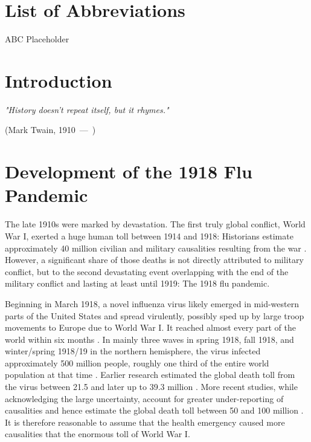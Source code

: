 \documentclass[12pt,a4paper]{article}
\let\oldquote\quote
\let\endoldquote\endquote
\renewenvironment{quote}[2][]
{\if\relax\detokenize{#1}\relax
	\def\quoteauthor{#2}%
	\else
	\def\quoteauthor{#2~---~#1}%
	\fi
	\oldquote}
{\par\nobreak\smallskip\hfill(\quoteauthor)%
	\endoldquote\addvspace{\bigskipamount}}
\begin{document}
\section*{List of Abbreviations}
 
\begin{abbrv}
 
\item[ABC]			Placeholder

 
\end{abbrv}
\newpage
\setcounter{page}{2}
\setlength{\baselineskip}{1.5\baselineskip}
\pagestyle{plain}


\section{Introduction}

\begin{quote}{Mark Twain, 1910}
	\textit{"History doesn't repeat itself, but it rhymes."}
\end{quote}


\section{Development of the 1918 Flu Pandemic}

The late 1910s were marked by devastation.
The first truly global conflict, World War I, exerted a huge human toll between 1914 and 1918:
Historians estimate approximately 40 million civilian and military causalities resulting from the war \citep{royde-smithWorldWarKilled2020}.
However, a significant share of those deaths is not directly attributed to military conflict,
but to the second devastating event overlapping with the end of the military conflict and lasting at least until 1919: The 1918 flu pandemic.

Beginning in March 1918, a novel influenza virus likely emerged in mid-western parts of the United States \citep{barrySiteOrigin19182004} and spread virulently, possibly sped up by large troop movements to Europe due to World War I. It reached almost every part of the world within six months \citep{pattersonGeographyMortality19181991}.
In mainly three waves in spring 1918, fall 1918, and winter/spring 1918/19 in the northern hemisphere, the virus infected approximately 500 million people, roughly one third of the entire world population at that time \citep{taubenberger1918InfluenzaMother2006}.
Earlier research estimated the global death toll from the virus between 21.5 \cite{jordanEpidemicInfluenzaSurvey1927} and later up to 39.3 million \citep{pattersonGeographyMortality19181991}.
More recent studies, while acknowledging the large uncertainty, account for greater under-reporting of causalities and hence estimate the global death toll between 50 and 100 million \citep{johnsonUpdatingAccountsGlobal2002}.
It is therefore reasonable to assume that the health emergency caused more causalities that the enormous toll of World War I.
\end{document}
